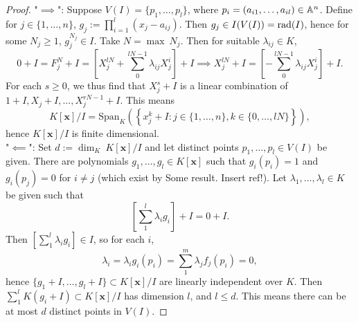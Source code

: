 \begin{proof}
    "$\implies$": Suppose $V(I)=\{p_1,\dots,p_l\}$, where $p_i = (a_{i1},\dots, a_{il})\in \mathbb{A}^n$. Define for $j\in\{1,\dots,n\}$, $g_j := \prod_{i=1}^l(x_j-a_{ij})$. Then $g_j\in I(V(I))=\mathrm{rad}(I)$, hence for some $N_j\geq1$, $g_j^{N_j} \in I$. Take $N=\max\ N_j$. Then for suitable $\lambda_{ij}\in K$, 
    $$0+I=F_j^N+I = \left[X_j^{lN} + \sum_0^{lN-1}\lambda_{ij}X_j^{i} \right] + I \implies X_j^{lN} + I = \left[-\sum_0^{lN-1}\lambda_{ij}X_j^{i}\right]+ I.$$
    For each $s\geq 0$, we thus find that $X_j^s+I$ is a linear combination of $1+I,X_j+I,\dots,X_j^{rN-1}+I$. This means $$K[\mathbf{x}]/I=\mathrm{Span}_K\left(\left\{ x_j^{k}+I : j\in\{1,\dots,n\}, k\in \{0,\dots, lN\} \right\}\right),$$
    hence $K[\mathbf{x}]/I$ is finite dimensional.\\
   "$\impliedby$": Set $d:= \dim_K\ K[\mathbf{x}]/I$ and let distinct points $p_1,\dots,p_l \in V(I)$ be given. There are polynomials $g_1,\dots,g_l\in K[\mathbf{x}]$ such that $g_i(p_i)=1$ and $g_i(p_j)=0$ for $i\neq j$ (which exist by {\Large Some result. Insert ref!}). Let $\lambda_1,\dots,\lambda_l\in K$ be given such that 
   $$\left[\sum_1^l \lambda_ig_i\right]+ I = 0+I.$$
   Then $\left[\sum_1^l \lambda_ig_i\right]\in I$, so for each $i$,
   $$\lambda_i = \lambda_ig_i(p_i) =\sum_1^m \lambda_jf_j(p_i) = 0,$$
   hence $\{g_1+I,\dots,g_l+I\}\subset K[\mathbf{x}]/I$ are linearly independent over $K$.  Then $\sum_1^l K(g_i+I)\subset K[\mathbf{x}]/I$ has dimension $l$, and $l\leq d$. This means there can be at most $d$ distinct points in $V(I)$.   
\end{proof}
